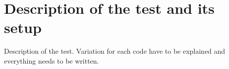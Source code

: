 \section{Description of the test and its setup}
Description of the test. Variation for each code have to be explained and everything needs to be written.